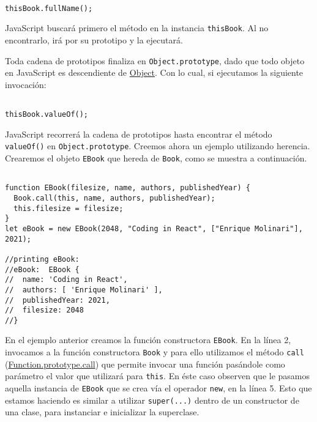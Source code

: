 \documentclass[a4paper, oneside, titlepage, 12pt]{paper}
\begin{document}
\begin{verbatim}

thisBook.fullName();
\end{verbatim}

JavaScript buscará primero el método en la instancia \texttt{thisBook}. Al no encontrarlo, irá por su prototipo y la ejecutará.
\newline

Toda cadena de prototipos finaliza en \texttt{Object.prototype}, dado que todo objeto en JavaScript es descendiente de \href{https://developer.mozilla.org/es/docs/Web/JavaScript/Reference/Global_Objects/Object}{Object}. Con lo cual, si ejecutamos la siguiente invocación:

\begin{verbatim}

thisBook.valueOf();
\end{verbatim}

JavaScript recorrerá la cadena de prototipos hasta encontrar el método \texttt{valueOf()} en \texttt{Object.prototype}. Creemos ahora un ejemplo utilizando herencia. Crearemos el objeto \texttt{EBook} que hereda de \texttt{Book}, como se muestra a continuación.

\begin{verbatim}

function EBook(filesize, name, authors, publishedYear) {
  Book.call(this, name, authors, publishedYear);
  this.filesize = filesize;
}
let eBook = new EBook(2048, "Coding in React", ["Enrique Molinari"], 2021);

//printing eBook:
//eBook:  EBook {
//  name: 'Coding in React',
//  authors: [ 'Enrique Molinari' ],
//  publishedYear: 2021,
//  filesize: 2048
//}
\end{verbatim}

En el ejemplo anterior creamos la función constructora \texttt{EBook}. En la línea 2, invocamos a la función constructora \texttt{Book} y para ello utilizamos el método \texttt{call} (\href{https://developer.mozilla.org/es/docs/Web/JavaScript/Reference/Global_Objects/Function/call}{Function.prototype.call}) que permite invocar una función pasándole como parámetro el valor que utilizará para \texttt{this}. En éste caso observen que le pasamos aquella instancia de \texttt{EBook} que se crea vía el operador \texttt{new}, en la línea 5. Esto que estamos haciendo es similar a utilizar \texttt{super(...)} dentro de un constructor de una clase, para instanciar e inicializar la superclase. 
\newline
\end{document}
